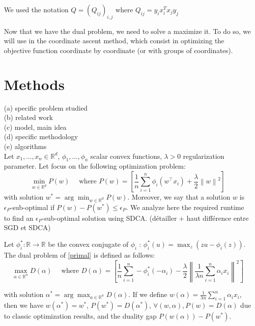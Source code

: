 \documentclass{article}
\newcommand{\norm}[1]{\left\|#1 \right\|}
\begin{document}
We used the notation $Q = (Q_{ij})_{i,j}$ where $Q_{ij} = y_i x_i^T x_j y_j$

Now that we have the dual problem, we need to solve a maximize it.
To do so, we will use in the coordinate ascent method, which consist in optimizing the objective function coordinate by coordinate (or with groups of coordinates).


\section{Methods}
(a) specific problem studied \\
(b) related work \\
(c) model, main idea \\
(d) specific methodology \\
(e) algorithms \\



Let $x_1, \dots, x_n \in \mathbb{R}^d$, $\phi_1, \dots, \phi_n$ scalar convex functions, $\lambda > 0$ regularization parameter.
Let focus on the following optimization problem:
\begin{equation}
    \min_{w \in \mathbb{R}^d} P(w) \quad \text{ where } P(w) = \left[ \dfrac{1}{n} \sum_{i=1}^n \phi_i(w^\top x_i) + \dfrac{\lambda}{2}\norm{w}^2 \right]
    \label{primal}
\end{equation}
with solution $w^{*} = \arg \min_{w \in \mathbb{R}^d} P(w)$.
Moreover, we say that a solution $w$ is $\epsilon_P$-sub-optimal if $P(w) - P(w^{*}) \leq \epsilon_P$.
We analyze here the required runtime to find an $\epsilon_P$-sub-optimal solution using SDCA. (détailler + haut différence entre SGD et SDCA)

Let $\phi_i^{*} : \mathbb{R} \rightarrow \mathbb{R}$ be the convex conjugate of $\phi_i$ : $\phi_i^{*}(u) = \max_z (zu-\phi_i(z))$.
The dual problem of \eqref{primal} is defined as follows:
\begin{equation}
    \max_{\alpha \in \mathbb{R}^n} D(\alpha) \quad \text{ where } D(\alpha) = \left[ \dfrac{1}{n} \sum_{i=1}^n -\phi_i^{*}(-\alpha_i) - \dfrac{\lambda}{2}\norm{\dfrac{1}{\lambda n}\sum_{i=1}^n \alpha_ix_i}^2 \right]
    \label{dual}
\end{equation}

with solution $\alpha^{*} = \arg \max_{a \in \mathbb{R}^n} D(\alpha)$.
If we define $w(\alpha) = \frac{1}{\lambda n} \sum_{i=1}^n \alpha_ix_i$, then we have $w(\alpha^{*}) = w^{*}$, $P(w^{*}) = D(\alpha^{*})$, $\forall (w,\alpha), P(w) = D(\alpha)$ due to classic optimization results, and the duality gap $P(w(\alpha)) - P(w^{*})$.
\end{document}
